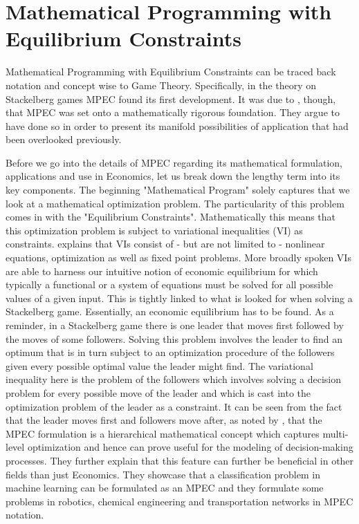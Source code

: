 \section{Mathematical Programming with Equilibrium Constraints} \label{generalMPEC}
\thispagestyle{plain} %

Mathematical Programming with Equilibrium Constraints can be traced back notation and concept wise to Game Theory. Specifically, in the theory on Stackelberg games MPEC found its first development. It was due to \cite{Luo.Pang.Ralph.1996}, though, that MPEC was set onto a mathematically rigorous foundation. They argue to have done so in order to present its manifold possibilities of application that had been overlooked previously.

Before we go into the details of MPEC regarding its mathematical formulation, applications and use in Economics, let us break down the lengthy term into its key components. The beginning "Mathematical Program" solely captures that we look at a mathematical optimization problem. The particularity of this problem comes in with the "Equilibrium Constraints". Mathematically this means that this optimization problem is subject to variational inequalities (VI) as constraints. \cite{Nagurney.1993} explains that VIs consist of - but are not limited to - nonlinear equations, optimization as well as fixed point problems. More broadly spoken VIs are able to harness our intuitive notion of economic equilibrium for which typically a functional or a system of equations must be solved for all possible values of a given input. This is tightly linked to what is looked for when solving a Stackelberg game. Essentially, an economic equilibrium has to be found. As a reminder, in a Stackelberg game there is one leader that moves first followed by the moves of some followers. Solving this problem involves the leader to find an optimum that is in turn subject to an optimization procedure of the followers given every possible optimal value the leader might find. The variational inequality here is the problem of the followers which involves solving a decision problem for every possible move of the leader and which is cast into the optimization problem of the leader as a constraint. It can be seen from the fact that the leader moves first and followers move after, as noted by \cite{Luo.Pang.Ralph.1996}, that the MPEC formulation is a hierarchical mathematical concept which captures multi-level optimization and hence can prove useful for the modeling of decision-making processes. They further explain that this feature can further be beneficial in other fields than just Economics. They showcase that a classification problem in machine learning can be formulated as an MPEC and they formulate some problems in robotics, chemical engineering and transportation networks in MPEC notation.

